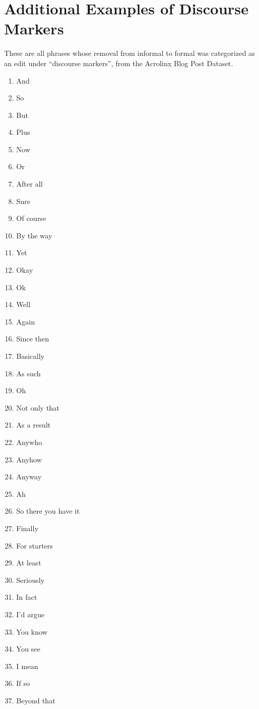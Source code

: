 \chapter{Additional Examples of Discourse Markers} 

\label{Appendix01} 

These are all phrases whose removal from informal to formal was categorized as an edit under ``discourse markers'', from the Acrolinx Blog Post Dataset.

\begin{enumerate}
  \item And
  \item So
  \item But
  \item Plus
  \item Now
  \item Or
  \item After all
  \item Sure
  \item Of course
  \item By the way
  \item Yet
  \item Okay
  \item Ok
  \item Well
  \item Again
  \item Since then
  \item Basically
  \item As such
  \item Oh
  \item Not only that
  \item As a result
  \item Anywho
  \item Anyhow
  \item Anyway
  \item Ah
  \item So there you have it
  \item Finally
  \item For starters
  \item At least
  \item Seriously
  \item In fact
  \item I'd argue
  \item You know
  \item You see
  \item I mean
  \item If so
  \item Beyond that

\end{enumerate}
